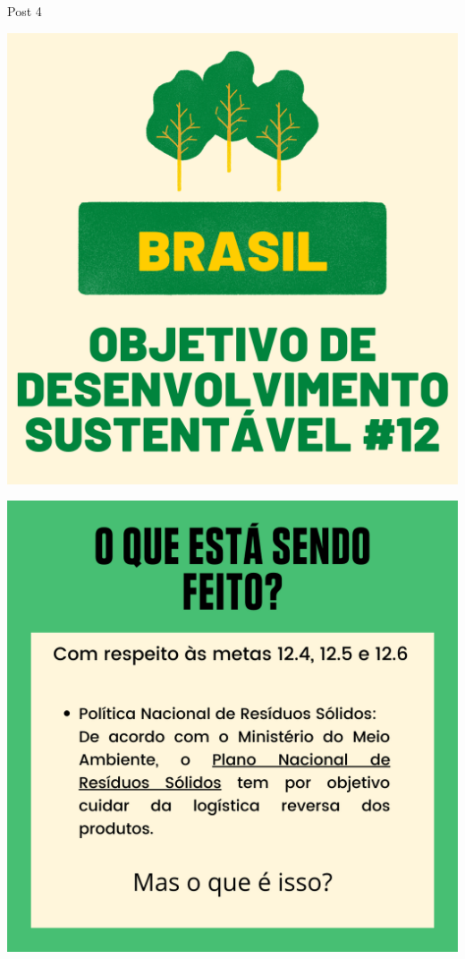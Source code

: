 \documentclass{beamer}
\begin{document}
	\begin{frame}{Post 4}
		\begin{minipage}{0.49\linewidth}
			\centering
			\includegraphics[width=\linewidth]{Post 4/1.png}
		\end{minipage}
		\hfill
		\begin{minipage}{0.49\linewidth}
			\centering
			\includegraphics[width=\linewidth]{Post 4/2.png}
		\end{minipage}
	\end{frame}
	
\end{document}
